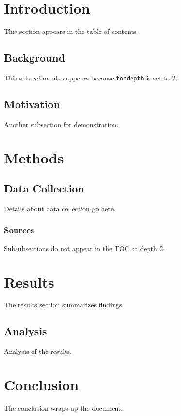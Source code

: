 \documentclass[11pt]{article}
\begin{document}
\tableofcontents

\section{Introduction}
This section appears in the table of contents.

\subsection{Background}
This subsection also appears because \texttt{tocdepth} is set to 2.

\subsection{Motivation}
Another subsection for demonstration.

\section{Methods}

\subsection{Data Collection}
Details about data collection go here.

\subsubsection{Sources}
Subsubsections do not appear in the TOC at depth 2.

\section{Results}
The results section summarizes findings.

\subsection{Analysis}
Analysis of the results.

\section{Conclusion}
The conclusion wraps up the document.
\end{document}
